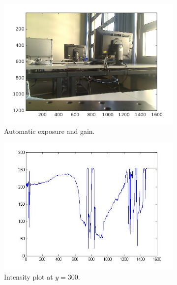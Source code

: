 \documentclass[a4paper, 12pt]{paper}
\begin{document}
\begin{figure}[h]
    \centering
    \begin{subfigure}[p]{0.45\textwidth}
        \includegraphics[width=\textwidth]{img/auto}
        \caption{Automatic exposure and gain.}
    \end{subfigure}
    \begin{subfigure}[p]{0.45\textwidth}
        \includegraphics[width=\textwidth]{img/auto_int}
        \caption{Intensity plot at $y=300$.}
    \end{subfigure}
    \centering
    \begin{subfigure}[p]{0.45\textwidth}

\end{subfigure}
\end{figure}
\end{document}
